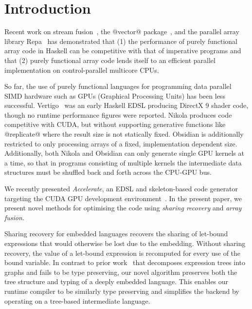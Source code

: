 \section{Introduction} %
\label{sec:Introduction}


Recent work on stream fusion~\cite{Coutts:stream-fusion}, the @vector@ package~\cite{Mainland:stream-fusion}, and the parallel array library Repa~\cite{Keller:Repa,Lippmeier:Stencil,Lippmeier:Guiding} has demonstrated that (1) the performance of purely functional array code in Haskell can be competitive with that of imperative programs and that (2) purely functional array code lends itself to an efficient parallel implementation on control-parallel multicore CPUs.

So far, the use of purely functional languages for programming data parallel SIMD hardware such as GPUs (Graphical Processing Units) has been less successful. Vertigo~\cite{Elliott:Vertigo} was an early Haskell EDSL producing DirectX 9 shader code, though no runtime performance figures were reported. Nikola \cite{Mainland:nikola} produces code competitive with CUDA, but without supporting generative functions like @replicate@ where the result size is not statically fixed. Obsidian \cite{Claessen:obsidian} is additionally restricted to only processing arrays of a fixed, implementation dependent size. Additionally, both Nikola and Obsidian can only generate single GPU kernels at a time, so that in programs consisting of multiple kernels the intermediate data structures must be shuffled back and forth across the CPU-GPU bus. 

We recently presented \emph{Accelerate}, an EDSL and skeleton-based code generator targeting the CUDA GPU development environment~\cite{Chakravarty:Accelerate}. In the present paper, we present novel methods for optimising the code using \emph{sharing recovery} and \emph{array fusion}. 

Sharing recovery for embedded languages recovers the sharing of let-bound expressions that would otherwise be lost due to the embedding. Without sharing recovery, the value of a let-bound expression is recomputed for every use of the bound variable. In contrast to prior work~\cite{Gill:2009dx} that decomposes expression trees into graphs and fails to be type preserving, our novel algorithm preserves both the tree structure and typing of a deeply embedded language. This enables our runtime compiler to be similarly type preserving and simplifies the backend by operating on a tree-based intermediate language.


